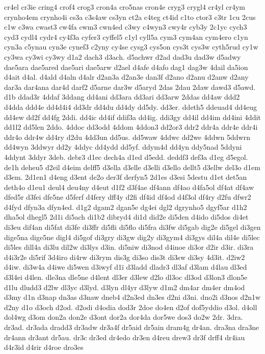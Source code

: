 {cr4el
cr3ie
cring4
crof4
crog3
cron4a
cro5nas
cron4e
cryg3
crygl4
cr4yl
cr4ym
crynho4em
crynho4i
cs3a
c3s4aw
cs3yn
ct2a
c4teg
ct4id
c1to
ctor3
c3tr
1cu
2cus
c1w
c3wa
cwast3
cw4fa
cwm3
cwn4ed
c3wy
c4wyn3
cwy4r
cyb3y
2c1yc
cych3
cyd3
cydl4
cydr4
cy4f3a
cyfer3
cyffel5
c1yl
cyll5a
cym3
cym4an
cym4ero
c1yn
cyn3a
c5ynau
cyn3e
cynef3
c2yny
cy4se
cysg3
cys5on
cys3t
cys3w
cyth5rud
cy1w
cy3wa
cy3wi
cy3wy
d1a2
dach3
d3ach.
d5achwr
d2ad
dad3u
dad3w
d5adwy
dae5ara
dae5ared
dae5ari
dae5arw
d2ael
d4afe
d4afo
dag1
dag3w
4dail
da5ion
d4ait
d4al.
d4ald
d4aln
d4alr
d2an3a
d2an3e
dan3f
d2ano
d2anu
d2anw
d2any
dar3a
dar4ana
dar4d
darf2
d5arne
dar3w
d5aryd
2das
2dau
2daw
dawd3
d5awd.
d1b
ddad3r
4ddaf
3ddang
dd4ani
dd3ara
dd3ari
dd3arw
2ddas
dd4aw
ddd2
d4dda
ddd4e
dd4d4i4
dd3dr
dd4du
dd4dy
dd5dy.
dd3er.
ddeth5
ddeuad4
dd4eug
dd4ew
dd2f
dd4fg
2ddi.
dd4ic
dd4if
ddif3a
dd4ig.
ddi3gy
dd4il
dd4im
dd4ini
4ddit
dd1l2
dd5len
2ddo.
4ddoc
dd3odd
4ddom
4ddon3
dd2or3
ddr2
ddr4a
ddr4e
ddr4i
ddr4o
ddr4w
dd4ry
d2du
4dd3un
dd5us.
dd5waw
4ddwc
dd2we
4ddwn
5ddwrn
dd4wyn
3ddwyr
dd2y
4ddyc
dd4ydd
dd5yf.
ddym4d
dd4yn
ddy5nad
5ddyni
4ddynt
3ddyr
3deb.
debr3
d1ec
dech4a
d1ed
d5edd.
deddf3
def3a
d1eg
d5egol.
de1h
deheu5
d2eil
d4eim
delff5
d3ella
d3elle
d3elli
d3ello
dellt5
d3ellw
del3o
d1em
d3em.
2d1en1
d4eng
d3ent
de2o
der3f
derfyn5
2d1es
d3esi
5destu
d1et
det5an
deth4o
d1eu1
deul4
deu4ny
d4eut
d1f2
d3f4ae
df4ann
df4ao
d4fa5ol
df4at
df4aw
dfed5r
d3fei
dfe5ne
d5ferf
d4fery
dff4y
d2fi
df4id
df4od
d4f3ol
df4ry
d2fu
dfwr2
d4fyd
dfyn3a
dfyn4ed.
d1g2
dgam2
dgan5e
dg4ei
dgl2
dgrynho5
dgyf5ar
d1h2
dha5ol
dhegl5
2d1i
di5ach
di1b2
dibryd4
di1d
did2e
di5den
d4ido
di5dos
di4et
di3eu
dif4an
di5fat
di3fe
di3ffr
di5fli
di5flo
di5fra
di3fw
di5gab
dig2e
di5gel
di3gen
dige5na
dige5ne
digl4
di5gof
di3gry
di3gw
dig2y
di3gym4
di3gys
dil4a
dil4e
di5lec
di5les
dill4a
di3lu
dil2w
di3lys
d3in.
di5niw
di3nod
d4inoe
di3or
d2ir
d3ir.
di3ra
d4i3r2e
di5rif
3d4iro
di4rw
di3rym
dis3g
di3so
dis3t
di3sw
di3sy
4d3it.
d2iw2
d4iw.
di3w4a
d4iwe
di5wen
d3iwyf
d1ï
d3ladd
dladr3
dl3af
d3lam
d4lau
dl3ed
d3l4ei
d4len.
dle3na
dle5ne
d4lent
dl3er
d3lew
d2lo
dl3oc
dl3od
d3lon3
dlon5e
d1lu
dludd3
d2lw
dl3yc
d3lyd.
d3lyn
dl4yr
d3lyw
d1m2
dm4ar
dm4er
dm4od
d3my
d1n
d3nap
dn3as
d3naw
dneb4
d2n3ed
dn3es
d2ni
d3ni.
dno2i
d3nos
d2n1w
d2ny
d1o
d3och
d2od.
d2odi
d4odia
dod3r
2doe
do4en
d2of
dof5yddio
d3ol.
d4oll
dol4wg
d3om
don2a
don2e
d3ont
dor2a
dor4da
dor5we
dos3
do2w
2dr.
3dra.
dr3ad.
dr3ada
dradd3
dr3adw
dr3a4f
dr5aid
dr5ain
dram4g
dr4an.
dra3na
dra3ne
dr4ann
dr3ant
dr5au.
dr3c
dr3ed
dr4edo
dr3en
d4reu
drew3
dr3f
drff4
dr4iau
d4r3id
d4rir
d4roe
dro3es
}
